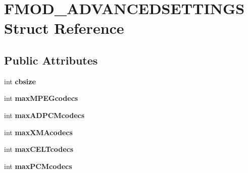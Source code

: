 \hypertarget{struct_f_m_o_d___a_d_v_a_n_c_e_d_s_e_t_t_i_n_g_s}{}\section{F\+M\+O\+D\+\_\+\+A\+D\+V\+A\+N\+C\+E\+D\+S\+E\+T\+T\+I\+N\+GS Struct Reference}
\label{struct_f_m_o_d___a_d_v_a_n_c_e_d_s_e_t_t_i_n_g_s}
\subsection*{Public Attributes}
\begin{DoxyCompactItemize}
\item 
int {\bfseries cbsize}\hypertarget{struct_f_m_o_d___a_d_v_a_n_c_e_d_s_e_t_t_i_n_g_s_a45f37c714e81702c153beaeeaf5789d9}{}\label{struct_f_m_o_d___a_d_v_a_n_c_e_d_s_e_t_t_i_n_g_s_a45f37c714e81702c153beaeeaf5789d9}

\item 
int {\bfseries max\+M\+P\+E\+Gcodecs}\hypertarget{struct_f_m_o_d___a_d_v_a_n_c_e_d_s_e_t_t_i_n_g_s_ac38a94fd8d9b1ad4ed77d111cfcafa71}{}\label{struct_f_m_o_d___a_d_v_a_n_c_e_d_s_e_t_t_i_n_g_s_ac38a94fd8d9b1ad4ed77d111cfcafa71}

\item 
int {\bfseries max\+A\+D\+P\+C\+Mcodecs}\hypertarget{struct_f_m_o_d___a_d_v_a_n_c_e_d_s_e_t_t_i_n_g_s_afebaec0ba3caa0367c9184416bd74f2a}{}\label{struct_f_m_o_d___a_d_v_a_n_c_e_d_s_e_t_t_i_n_g_s_afebaec0ba3caa0367c9184416bd74f2a}

\item 
int {\bfseries max\+X\+M\+Acodecs}\hypertarget{struct_f_m_o_d___a_d_v_a_n_c_e_d_s_e_t_t_i_n_g_s_a4c351e7bc430c6c9aa9c87ad5fae8324}{}\label{struct_f_m_o_d___a_d_v_a_n_c_e_d_s_e_t_t_i_n_g_s_a4c351e7bc430c6c9aa9c87ad5fae8324}

\item 
int {\bfseries max\+C\+E\+L\+Tcodecs}\hypertarget{struct_f_m_o_d___a_d_v_a_n_c_e_d_s_e_t_t_i_n_g_s_a0f51ebed22a9eda603d37e2f9ccf5376}{}\label{struct_f_m_o_d___a_d_v_a_n_c_e_d_s_e_t_t_i_n_g_s_a0f51ebed22a9eda603d37e2f9ccf5376}

\item 
int {\bfseries max\+P\+C\+Mcodecs}\hypertarget{struct_f_m_o_d___a_d_v_a_n_c_e_d_s_e_t_t_i_n_g_s_a4fc5ae4871fcfea0c82f818c6f7a9128}{}\label{struct_f_m_o_d___a_d_v_a_n_c_e_d_s_e_t_t_i_n_g_s_a4fc5ae4871fcfea0c82f818c6f7a9128}


\end{DoxyCompactItemize}
